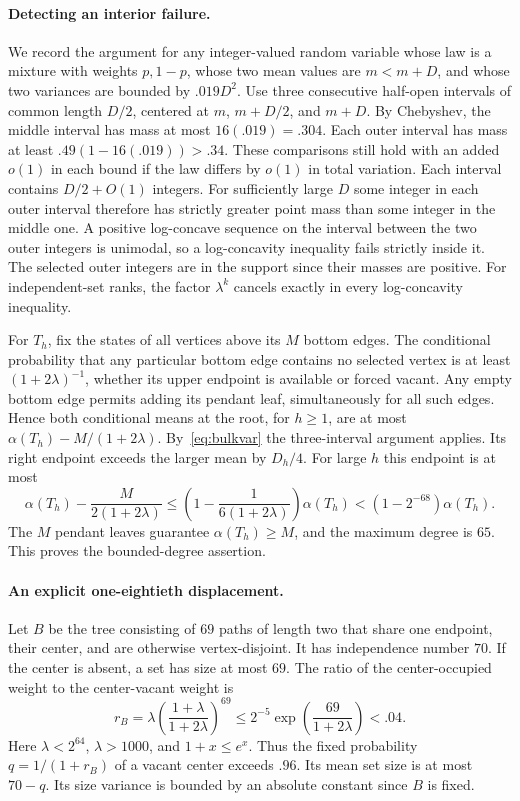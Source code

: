\documentclass[11pt,a4paper]{article}
\numberwithin{equation}{section}
\begin{document}
\paragraph{Detecting an interior failure.}
We record the argument for any integer-valued random variable whose law
is a mixture with weights $p,1-p$, whose two mean values are $m<m+D$,
and whose two variances are bounded by $.019D^2$. Use three consecutive
half-open intervals of common length $D/2$, centered at
$m$, $m+D/2$, and $m+D$. By Chebyshev, the middle interval has mass
at most $16(.019)=.304$. Each outer interval has mass at least
$.49(1-16(.019))>.34$. These comparisons still hold with an added
$o(1)$ in each bound if the law differs by $o(1)$ in total variation.
Each interval contains $D/2+O(1)$ integers. For sufficiently large $D$
some integer in each outer interval therefore has strictly greater
point mass than some integer in the middle one. A positive log-concave
sequence on the interval between the two outer integers is unimodal,
so a log-concavity inequality fails strictly inside it. The selected
outer integers are in the support since their masses are positive. For
independent-set ranks, the factor $\lambda^k$ cancels exactly in every
log-concavity inequality.

For $T_h$, fix the states of all vertices above its $M$ bottom edges.
The conditional probability that any particular bottom edge contains
no selected vertex is at least $(1+2\lambda)^{-1}$, whether its upper
endpoint is available or forced vacant. Any empty bottom edge permits
adding its pendant leaf, simultaneously for all such edges.
Hence both conditional means at the root, for $h\ge1$, are at most
$\alpha(T_h)-M/(1+2\lambda)$. By~\eqref{eq:bulkvar} the three-interval
argument applies. Its right endpoint exceeds the larger mean by $D_h/4$.
For large $h$ this endpoint is at most
\[
 \alpha(T_h)-\frac{M}{2(1+2\lambda)}
 \le \left(1-\frac1{6(1+2\lambda)}\right)\alpha(T_h)
 <(1-2^{-68})\alpha(T_h).
\]
The $M$ pendant leaves guarantee $\alpha(T_h)\ge M$, and the maximum
degree is $65$. This proves the bounded-degree assertion.

\paragraph{An explicit one-eightieth displacement.}
Let $B$ be the tree consisting of $69$ paths of length two that share one
endpoint, their center, and are otherwise vertex-disjoint. It has independence number $70$. If the center is absent,
a set has size at most $69$. The ratio of the center-occupied weight
to the center-vacant weight is
\[
 r_B=\lambda\left(\frac{1+\lambda}{1+2\lambda}\right)^{69}
 \le 2^{-5}\exp\!\left(\frac{69}{1+2\lambda}\right)<.04 .
\]
Here $\lambda<2^{64}$, $\lambda>1000$, and $1+x\le e^x$.
Thus the fixed probability $q=1/(1+r_B)$ of a vacant center exceeds $.96$.
Its mean set size is at most $70-q$. Its size variance is bounded
by an absolute constant since $B$ is fixed.
\end{document}
